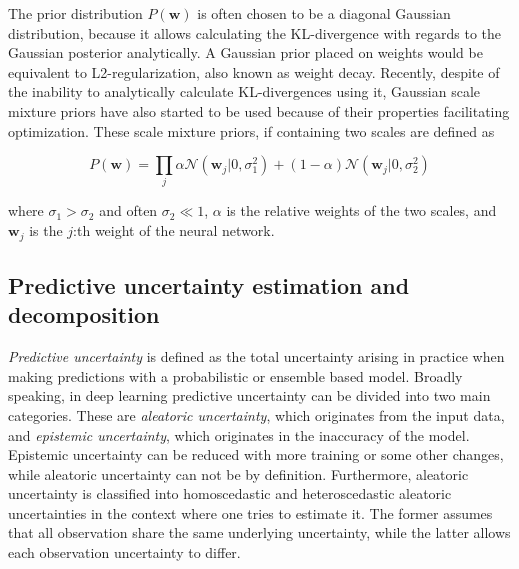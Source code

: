 	
	The prior distribution $P(\pmb{w})$ is often chosen to be a diagonal Gaussian distribution, because it allows calculating the KL-divergence with regards to the Gaussian posterior analytically. A Gaussian prior placed on weights would be equivalent to L2-regularization, also known as weight decay. Recently, despite of the inability to analytically calculate KL-divergences using it, Gaussian scale mixture priors have also started to be used \cite{blundell_weight_2015, shridhar_comprehensive_2019} because of their properties facilitating optimization. These scale mixture priors, if containing two scales are defined as 
	
	\begin{equation}
	\label{eq:gsm}
		P(\pmb{w}) = 
		\prod_{j}\alpha \mathcal{N}(\pmb{w}_j|0,\sigma_1^2) + (1-\alpha)\mathcal{N}(\pmb{w}_j|0,\sigma_2^2)
	\end{equation}  
	
	where $\sigma_1 > \sigma_2$ and often $\sigma_2 \ll 1$, $\alpha$ is the relative weights of the two scales, and $\pmb{w}_j$ is the $j$:th weight of the neural network. 
	
\subsection{Predictive uncertainty estimation and decomposition}

\textit{Predictive uncertainty} is defined as the total uncertainty arising in practice when making predictions with a probabilistic or ensemble based model.
Broadly speaking, in deep learning predictive uncertainty can be divided into two main categories. These are  \textit{aleatoric uncertainty}, which originates from the input data, and \textit{epistemic uncertainty}, which originates in the inaccuracy of the model. Epistemic uncertainty can be reduced with more training or some other changes, while aleatoric uncertainty can not be by definition. Furthermore, aleatoric uncertainty is classified into homoscedastic and heteroscedastic aleatoric uncertainties in the context where one tries to estimate it. The former assumes that all observation share the same underlying uncertainty, while the latter allows each observation uncertainty to differ. \cite{shridhar_comprehensive_2019}

